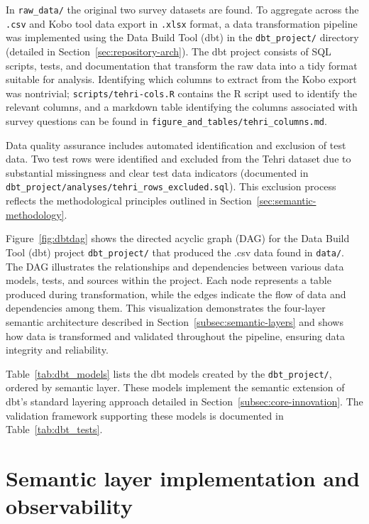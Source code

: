 \documentclass{article}
\begin{document}
In \texttt{raw\_data/} the original two survey datasets are found. To aggregate across the \texttt{.csv} \cite{csv_rfc} and Kobo tool \cite{kobo_toolbox} data export in \texttt{.xlsx} format, a data transformation pipeline was implemented using the Data Build Tool (dbt) \cite{dbt_core,dbt_duckdb} in the \texttt{dbt\_project/} directory (detailed in Section~\ref{sec:repository-arch}). The dbt project consists of SQL \cite{sql} scripts, tests, and documentation that transform the raw data into a tidy format suitable for analysis. Identifying which columns to extract from the Kobo export was nontrivial; \texttt{scripts/tehri-cols.R} contains the R script \cite{r_core,tidyverse} used to identify the relevant columns, and a markdown table \cite{markdown} identifying the columns associated with survey questions can be found in \texttt{figure\_and\_tables/tehri\_columns.md}.

Data quality assurance includes automated identification and exclusion of test data. Two test rows were identified and excluded from the Tehri dataset due to substantial missingness and clear test data indicators (documented in \texttt{dbt\_project/analyses/tehri\_rows\_excluded.sql}). This exclusion process reflects the methodological principles outlined in Section~\ref{sec:semantic-methodology}.

Figure~\ref{fig:dbtdag} shows the directed acyclic graph (DAG) for the Data Build Tool (dbt) project \texttt{dbt\_project/} that produced the .csv data found in \texttt{data/}. The DAG illustrates the relationships and dependencies between various data models, tests, and sources within the project. Each node represents a table produced during transformation, while the edges indicate the flow of data and dependencies among them. This visualization demonstrates the four-layer semantic architecture described in Section~\ref{subsec:semantic-layers} and shows how data is transformed and validated throughout the pipeline, ensuring data integrity and reliability.

Table~\ref{tab:dbt_models} lists the dbt models created by the \texttt{dbt\_project/}, ordered by semantic layer. These models implement the semantic extension of dbt's standard layering approach detailed in Section~\ref{subsec:core-innovation}. The validation framework supporting these models is documented in Table~\ref{tab:dbt_tests}. 



\section{Semantic layer implementation and observability}
\label{sec:semantic-implementation}
\end{document}
